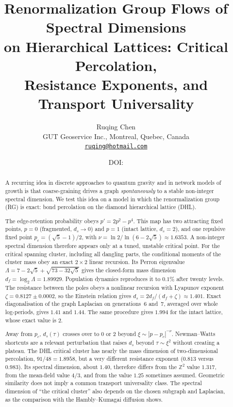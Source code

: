 \documentclass[11pt]{article}
\title{Renormalization Group Flows of Spectral Dimensions\\ on Hierarchical Lattices: Critical Percolation,\\ Resistance Exponents, and Transport Universality}
\author{Ruqing Chen\\[2pt]
\small GUT Geoservice Inc., Montreal, Quebec, Canada\\
\small \href{mailto:ruqing@hotmail.com}{\texttt{ruqing@hotmail.com}}}
\date{\small DOI: \href{https://doi.org/\paperdoi}{\paperdoi}}
\theoremstyle{remark}\newtheorem*{remark}{Remark}
\newcommand{\ZZ}{\mathbb{Z}}
\begin{document}
\maketitle

\begin{abstract}
A recurring idea in discrete approaches to quantum gravity and in network models of growth is that coarse-graining
drives a graph \emph{spontaneously} to a stable non-integer spectral dimension. We test this idea on a model in which
the renormalization group (RG) is exact: bond percolation on the diamond hierarchical lattice (DHL).

The edge-retention probability obeys $p'=2p^2-p^4$. This map has two attracting fixed points, $p=0$ (fragmented,
$d_s\to0$) and $p=1$ (intact lattice, $d_s=2$), and one repulsive fixed point $p_c=(\sqrt5-1)/2$, with
$\nu=\ln2/\ln(6-2\sqrt5)\approx1.6353$. A non-integer spectral dimension therefore appears only at a tuned, unstable
critical point. For the critical spanning cluster, including all dangling parts, the conditional moments of the
cluster mass obey an exact $2\times2$ linear recursion. Its Perron eigenvalue $\Lambda=7-2\sqrt5+\sqrt{73-32\sqrt5}$ gives
the closed-form mass dimension $d_f=\log_2\Lambda=1.89929$. Population dynamics reproduces it to $0.1\%$ after twenty
levels. The resistance between the poles obeys a nonlinear recursion with Lyapunov exponent $\zeta=0.8127\pm0.0002$, so
the Einstein relation gives $d_s=2d_f/(d_f+\zeta)\approx1.401$. Exact diagonalisation of the graph Laplacian on generations~6
and~7, averaged over whole log-periods, gives $1.41$ and $1.44$. The same procedure gives $1.994$ for the intact lattice,
whose exact value is $2$.

Away from $p_c$, $d_s(\tau)$ crosses over to $0$ or $2$ beyond $\xi\sim|p-p_c|^{-\nu}$. Newman--Watts shortcuts are a relevant
perturbation that raises $d_s$ beyond $\tau\sim\xi^2$ without creating a plateau. The DHL critical cluster has nearly the
mass dimension of two-dimensional percolation, $91/48=1.8958$, but a very different resistance exponent ($0.813$ versus
$0.983$). Its spectral dimension, about $1.40$, therefore differs from the $\ZZ^2$ value $1.317$, from the mean-field value
$4/3$, and from the value $1.25$ sometimes assumed. Geometric similarity does not imply a common transport universality
class. The spectral dimension of ``the critical cluster'' also depends on the chosen subgraph and Laplacian, as the
comparison with the Hambly--Kumagai diffusion shows.
\end{abstract}
\end{document}

